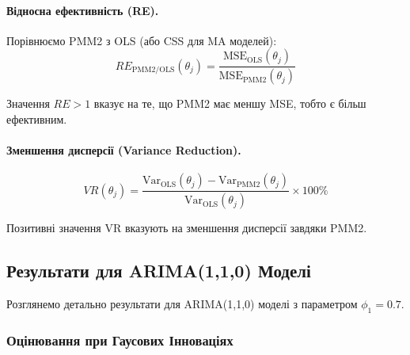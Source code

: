\documentclass[12pt,a4paper]{article}
\begin{document}
\paragraph{Відносна ефективність (RE).}

Порівнюємо PMM2 з OLS (або CSS для MA моделей):
\begin{equation}
\label{eq:relative_efficiency_empirical}
RE_{\text{PMM2/OLS}}(\theta_j) = \frac{\text{MSE}_{\text{OLS}}(\theta_j)}{\text{MSE}_{\text{PMM2}}(\theta_j)}
\end{equation}

Значення $RE > 1$ вказує на те, що PMM2 має меншу MSE, тобто є більш ефективним.

\paragraph{Зменшення дисперсії (Variance Reduction).}
\begin{equation}
\label{eq:variance_reduction}
VR(\theta_j) = \frac{\text{Var}_{\text{OLS}}(\theta_j) - \text{Var}_{\text{PMM2}}(\theta_j)}{\text{Var}_{\text{OLS}}(\theta_j)} \times 100\%
\end{equation}

Позитивні значення VR вказують на зменшення дисперсії завдяки PMM2.

\subsection{Результати для ARIMA(1,1,0) Моделі}
\label{subsec:results_arima110}

Розглянемо детально результати для ARIMA(1,1,0) моделі з параметром $\phi_1 = 0.7$.

\subsubsection{Оцінювання при Гаусових Інноваціях}
\end{document}
